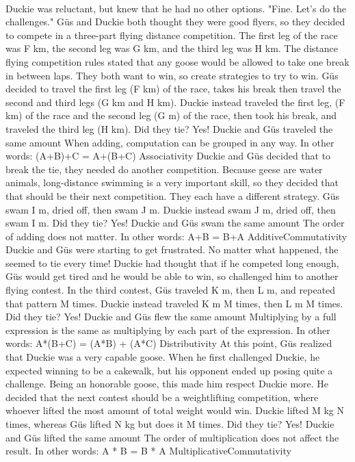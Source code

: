 \documentclass[a4paper,11pt ]{book}
\begin{document}
\paragraph{} Duckie was reluctant, but knew that he had no other options. "Fine. Let's do the challenges."
\pagebreak
{Güs and Duckie both thought they were good flyers, so they decided to compete in a three-part flying distance competition. The first leg of the race was F km, the second leg was G km, and the third leg was H km. The distance flying competition rules stated that any goose would be allowed to take one break in between laps. They both want to win, so create strategies to try to win. Güs decided to travel the first leg (F km) of the race, takes his break then travel the second and third legs (G km and H km). Duckie instead traveled the first leg, (F km) of the race and the second leg (G m) of the race, then took his break, and traveled the third leg (H km). Did they tie?}
{Yes! Duckie and Güs traveled the same amount}
{When adding, computation can be grouped in any way. In other words: (A+B)+C = A+(B+C)}
{Associativity}
{Duckie and Güs decided that to break the tie, they needed do another competition. \linebreak Because geese are water animals, long-distance swimming is a very important skill, so they decided that that should be their next competition. They each have a different strategy.  Güs swam I m, dried off, then swam J m. Duckie instead swam J m, dried off, then swam I m. Did they tie?}
{Yes! Duckie and Güs swam the same amount}
{The order of adding does not matter. In other words: A+B = B+A}
{AdditiveCommutativity}
{Duckie and Güs were starting to get frustrated. No matter what happened, the seemed to tie every time! Duckie had thought that if he competed long enough, Güs would get tired and he would be able to win, so challenged him to another flying contest. In the third contest, Güs traveled K m, then L m, and repeated that pattern M times. Duckie instead traveled K m M times, then L m M times. Did they tie?}
{Yes! Duckie and Güs flew the same amount}
{Multiplying by a full expression is the same as multiplying by each part of the expression. In other words: A*(B+C) = (A*B) + (A*C)}
{Distributivity}
{At this point, Güs realized that Duckie was a very capable goose. When he first challenged Duckie, he expected winning to be a cakewalk, but his opponent ended up posing quite a challenge. Being an honorable goose, this made him respect Duckie more. He decided that the next contest should be a weightlifting competition, where whoever lifted the most amount of total weight would win. Duckie lifted M kg N times, whereas Güs lifted N kg but does it M times. Did they tie?}
{Yes! Duckie and Güs lifted the same amount}
{The order of multiplication does not affect the result. In other words: A * B = B * A}
{MultiplicativeCommutativity}
\end{document}
